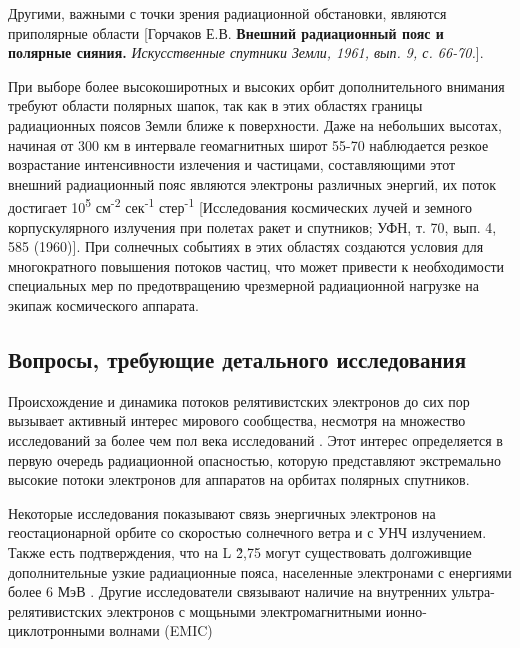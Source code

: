 Другими, важными с точки зрения радиационной обстановки, являются приполярные области [Горчаков Е.В. \textbf{Внешний радиационный пояс и полярные сияния. }\emph{Искусственные спутники Земли, 1961, вып. 9, с. 66-70.}].

При выборе более высокоширотных и высоких орбит дополнительного внимания требуют области полярных шапок, так как в этих областях границы радиационных поясов Земли ближе к поверхности. Даже на небольших высотах, начиная от 300 км в интервале геомагнитных широт 55-70 наблюдается резкое возрастание интенсивности излечения и частицами, составляющими этот внешний радиационный пояс являются электроны различных энергий, их поток достигает 10\textsuperscript{5} см\textsuperscript{-2} сек\textsuperscript{-1} стер\textsuperscript{-1} [Исследования космических лучей и земного корпускулярного излучения при полетах ракет и спутников; УФН, т. 70, вып. 4, 585 (1960)]. При солнечных событиях в этих областях создаются условия для многократного повышения потоков частиц, что может привести к необходимости специальных мер по предотвращению чрезмерной радиационной нагрузке на экипаж космического аппарата.

\subsection{Вопросы, требующие детального исследования}
Происхождение и динамика потоков релятивистских электронов до сих пор вызывает активный интерес мирового сообщества, несмотря на множество исследований  за более чем пол века исследований \cite{Gussenhoven1997,Borovsky2010,Holeman1991,Miyoshi2011,Chen2016,Turner2013,Brautigam2001,Borovsky2010a,Gussenhoven1995,Borovsky2011,Baker2013,Mullen1998,Chen2014,Morley2010,Potapov2014,Denton2010}. Этот интерес определяется в первую очередь радиационной опасностью, которую представляют экстремально высокие потоки электронов для аппаратов на орбитах полярных спутников.

Некоторые исследования показывают связь энергичных электронов на геостационарной орбите со скоростью солнечного ветра и с УНЧ излучением\cite{potapov2012}. Также есть подтверждения, что на L \~ 2,75 могут существовать долгоживщие дополнительные узкие радиационные пояса, населенные электронами с енергиями более 6 МэВ \cite{lazutin2012}. 
Другие исследователи связывают наличие на внутренних ультра-релятивистских электронов с мощьными электромагнитными ионно-циклотронными волнами (EMIC) \cite{Shprits2013} 

